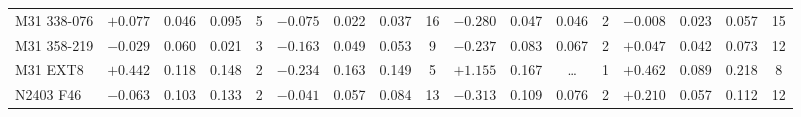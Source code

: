 \documentclass{aa}
\begin{document}
\begin{appendix}
\begin{table*}
\begin{adjustbox}{width=1\textwidth}
{\begin{tabular}{l cccccccccccccccc}
M31 338-076   & $+0.077$ & 0.046 & 0.095 & 5 & $-0.075$ & 0.022 & 0.037 & 16 & $-0.280$ & 0.047 & 0.046 & 2 & $-0.008$ & 0.023 & 0.057 & 15 \\
M31 358-219   & $-0.029$ & 0.060 & 0.021 & 3 & $-0.163$ & 0.049 & 0.053 & 9 & $-0.237$ & 0.083 & 0.067 & 2 & $+0.047$ & 0.042 & 0.073 & 12 \\
M31 EXT8      & $+0.442$ & 0.118 & 0.148 & 2 & $-0.234$ & 0.163 & 0.149 & 5 & $+1.155$ & 0.167 & \ldots & 1 & $+0.462$ & 0.089 & 0.218 & 8 \\
N2403 F46     & $-0.063$ & 0.103 & 0.133 & 2 & $-0.041$ & 0.057 & 0.084 & 13 & $-0.313$ & 0.109 & 0.076 & 2 & $+0.210$ & 0.057 & 0.112 & 12 \\
\hline
\end{tabular}
}
\end{adjustbox}
\end{table*}


\end{appendix}
\end{document}
